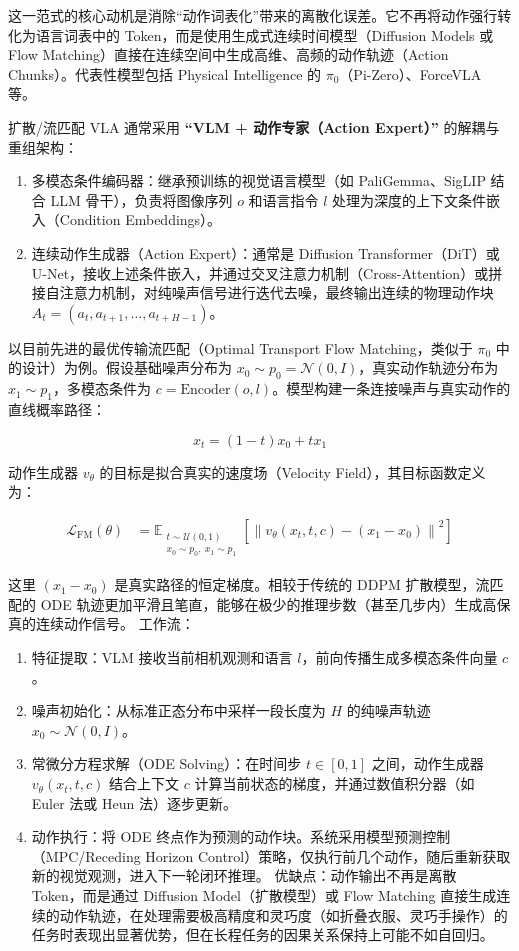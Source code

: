 这一范式的核心动机是消除``动作词表化''带来的离散化误差。它不再将动作强行转化为语言词表中的 Token，而是使用生成式连续时间模型（Diffusion Models 或 Flow Matching）直接在连续空间中生成高维、高频的动作轨迹（Action Chunks）。代表性模型包括 Physical Intelligence 的 \(\pi_0\)（Pi-Zero）、ForceVLA 等。

扩散/流匹配 VLA 通常采用 \textbf{``VLM + 动作专家（Action Expert）''} 的解耦与重组架构：

\begin{enumerate}
\def\labelenumi{\arabic{enumi}.}
\item
  多模态条件编码器：继承预训练的视觉语言模型（如 PaliGemma、SigLIP 结合 LLM 骨干），负责将图像序列 \(o\) 和语言指令 \(l\) 处理为深度的上下文条件嵌入（Condition Embeddings）。
\item
  连续动作生成器（Action Expert）：通常是 Diffusion Transformer（DiT）或 U-Net，接收上述条件嵌入，并通过交叉注意力机制（Cross-Attention）或拼接自注意力机制，对纯噪声信号进行迭代去噪，最终输出连续的物理动作块 \(A_t=(a_t,a_{t+1},\ldots,a_{t+H-1})\)。
\end{enumerate}

以目前先进的最优传输流匹配（Optimal Transport Flow Matching，类似于 \(\pi_0\) 中的设计）为例。假设基础噪声分布为 \(x_0\sim p_0=\mathcal{N}(0,I)\)，真实动作轨迹分布为 \(x_1\sim p_1\)，多模态条件为 \(c=\mathrm{Encoder}(o,l)\)。模型构建一条连接噪声与真实动作的直线概率路径：

\[
x_t=(1-t)x_0+t x_1
\]

动作生成器 \(v_\theta\) 的目标是拟合真实的速度场（Velocity Field），其目标函数定义为：

\[
\begin{aligned}
\mathcal{L}_{\mathrm{FM}}(\theta)
&=
\mathbb{E}_{\substack{t\sim \mathcal{U}(0,1)\\ x_0\sim p_0,\ x_1\sim p_1}}
\left[
\left\|v_\theta(x_t,t,c)-(x_1-x_0)\right\|^2
\right]
\end{aligned}
\]

这里 \((x_1-x_0)\) 是真实路径的恒定梯度。相较于传统的 DDPM 扩散模型，流匹配的 ODE 轨迹更加平滑且笔直，能够在极少的推理步数（甚至几步内）生成高保真的连续动作信号。
工作流：

\begin{enumerate}
\def\labelenumi{\arabic{enumi}.}
\item
  特征提取：VLM 接收当前相机观测和语言 \(l\)，前向传播生成多模态条件向量 \(c\)。
\item
  噪声初始化：从标准正态分布中采样一段长度为 \(H\) 的纯噪声轨迹 \(x_0\sim\mathcal{N}(0,I)\)。
\item
  常微分方程求解（ODE Solving）：在时间步 \(t\in[0,1]\) 之间，动作生成器 \(v_\theta(x_t,t,c)\) 结合上下文 \(c\) 计算当前状态的梯度，并通过数值积分器（如 Euler 法或 Heun 法）逐步更新。
\item
  动作执行：将 ODE 终点作为预测的动作块。系统采用模型预测控制（MPC/Receding Horizon Control）策略，仅执行前几个动作，随后重新获取新的视觉观测，进入下一轮闭环推理。
  优缺点：动作输出不再是离散 Token，而是通过 Diffusion Model（扩散模型）或 Flow Matching 直接生成连续的动作轨迹，在处理需要极高精度和灵巧度（如折叠衣服、灵巧手操作）的任务时表现出显著优势，但在长程任务的因果关系保持上可能不如自回归。
\end{enumerate}

